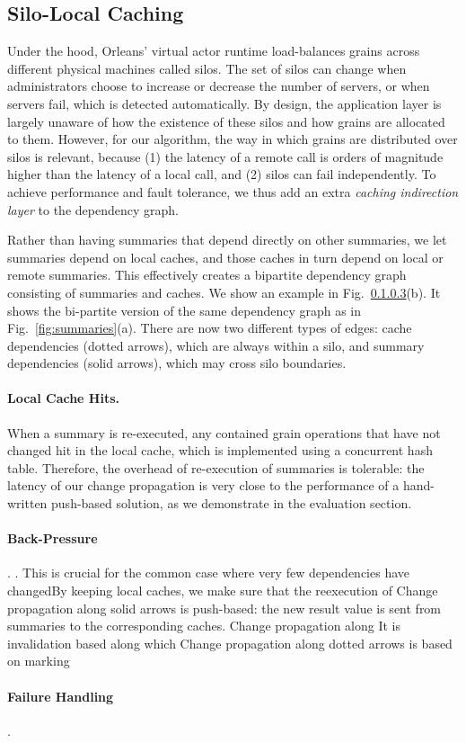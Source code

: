 \subsection{Silo-Local Caching}\label{sec:bp}

Under the hood, Orleans' virtual actor runtime load-balances grains across different physical machines called silos. The set of silos can change when administrators choose to increase or decrease the number of servers, or when servers fail, which is detected automatically. By design, the application layer is largely unaware of how the existence of these silos and how grains are allocated to them. However, for our algorithm, the way in which grains are distributed over silos is relevant, because (1) the latency of a remote call is orders of magnitude higher than the latency of a local call, and (2) silos can fail independently. To achieve performance and fault tolerance, we thus add an extra \emph{caching indirection layer} to the dependency graph.

Rather than having summaries that depend directly on other summaries, we let summaries depend on local caches, and those caches in turn depend on local or remote summaries. This effectively creates a bipartite dependency graph consisting of summaries and caches. We show an example in Fig.~\ref{}(b). It shows the bi-partite version of the same dependency graph as in Fig.~\ref{fig:summaries}(a). There are now two different types of edges: cache dependencies (dotted arrows), which are always within a silo, and summary dependencies (solid arrows), which may cross silo boundaries. 

\paragraph{Local Cache Hits.} When a summary is re-executed, any contained grain operations that have not changed hit in the local cache, which is implemented using a concurrent hash table. Therefore, the overhead of re-execution of summaries is tolerable: the latency of our change propagation is very close to the performance of a hand-written push-based solution, as we demonstrate in the evaluation section.

\paragraph{Back-Pressure}. 
. This is crucial for the common case where very few dependencies have changedBy keeping local caches, we make sure that the reexecution of
Change propagation along solid arrows is push-based: the new result value is sent from summaries to the corresponding caches. Change propagation along It is invalidation based along which  Change propagation along dotted arrows is based on marking

\paragraph{Failure Handling}. 

